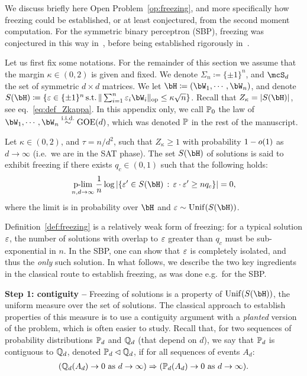 We discuss briefly here Open Problem~\ref{op:freezing}, and more specifically how freezing could be established, 
or at least conjectured, from the second moment computation.
For the symmetric binary perceptron (SBP), freezing was conjectured in this way in~\cite{aubin2019storage}, before being established rigorously in~\cite{perkins2021frozen,abbe2022proof}.

\myskip 
Let us first fix some notations.
For the remainder of this section we assume that the margin $\kappa \in (0,2)$ is given and fixed.
We denote $\Sigma_n \coloneqq \{\pm 1\}^n$, and $\mcS_d$ the set of symmetric $d \times d$ matrices.
We let $\bH \coloneqq (\bW_1, \cdots, \bW_n)$, and denote $S(\bH) \coloneqq \{\eps \in \{\pm 1\}^n \, \textrm{s.t.} \, \|\sum_{i=1}^n \eps_i \bW_i\|_{\op} \leq \kappa \sqrt{n} \}$.
Recall that $Z_\kappa = |S(\bH)|$, see eq.~\eqref{eq:def_Zkappa}.
In this appendix only, we call $\mathbb{P}_0$ the law of $\bW_1, \cdots, \bW_n \iid \GOE(d)$, which was denoted $\mathbb{P}$ in the rest of the manuscript.

\begin{definition}[Freezing]\label{def:freezing}
    Let $\kappa \in (0,2)$, and $\tau = n/d^2$, such that $Z_\kappa \geq 1$ with probability $1 - o(1)$ as $d \to \infty$ (i.e.\ we are in the SAT phase).
    The set $S(\bH)$ of solutions is said to exhibit freezing
    if there exists $q_c \in (0,1)$ such that the following holds:
    \begin{align*}
        \plim_{n,d \to \infty} \frac{1}{n} \log |\{\eps' \in S(\bH) \, : \, \eps \cdot \eps' \geq n q_c\}| = 0,
    \end{align*}
    where the limit is in probability over $\bH$ and $\eps \sim \Unif(S(\bH))$.
\end{definition}
\noindent
Definition~\ref{def:freezing} is a relatively weak form of freezing: for a typical solution $\varepsilon$, the number of solutions with overlap to $\varepsilon$ greater than $q_c$  
must be sub-exponential in $n$. In the SBP, one can show that $\varepsilon$ is completely isolated, and thus the \emph{only} such solution.
In what follows, we describe the two key ingredients in the classical route to establish freezing, as was done e.g.\ for the SBP.

\myskip 
\textbf{Step 1: contiguity --}
Freezing of solutions is a property of $\Unif(S(\bH))$, the uniform measure over the set of solutions.
The classical approach to establish properties of this measure is to use a contiguity argument with a \emph{planted} version of the problem, 
which is often easier to study.
Recall that, for two sequences of probability distributions $\mathbb{P}_d$ and $\mathbb{Q}_d$ (that depend on $d$), we say that $\mathbb{P}_d$ is contiguous to $\mathbb{Q}_d$, denoted $\mathbb{P}_d \lhd \mathbb{Q}_d$, 
if for all sequences of events $A_d$:
\begin{align}\label{eq:contiguity}
(\mathbb{Q}_d(A_d) \to 0 \textrm{ as } d \to \infty)
 \Rightarrow 
(\mathbb{P}_d(A_d) \to 0 \textrm{ as } d \to \infty).
\end{align}

